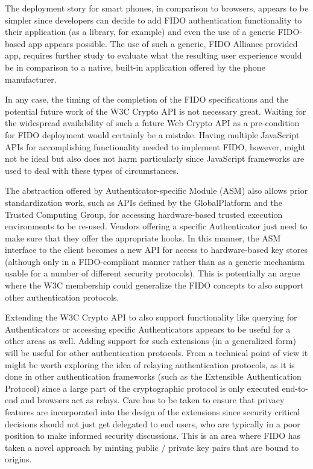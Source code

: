 \documentclass[peerreview, a4paper, 7pt]{IEEEtran}
\begin{document}
The deployment story for smart phones, in comparison to browsers, appears to be simpler since developers can decide to add FIDO authentication functionality to their application (as a library, for example) and even the use of a generic FIDO-based app appears possible. The use of such a generic, FIDO Alliance provided app, requires further study to evaluate what the resulting user experience would be in comparison to a native, built-in application offered by the phone manufacturer. 

In any case, the timing of the completion of the FIDO specifications and the potential future work of the W3C Crypto API is not necessary great. Waiting for the widespread availability of such a future Web Crypto API as a pre-condition for FIDO deployment would certainly be a mistake. Having multiple JavaScript APIs for accomplishing functionality needed to implement FIDO, however, might not be ideal but also does not harm particularly since JavaScript frameworks are used to deal with these types of circumstances.  

The abstraction offered by Authenticator-specific Module (ASM) also allows prior standardization work, such as APIs defined by the GlobalPlatform and the Trusted Computing Group, for accessing hardware-based trusted execution environments to be re-used. Vendors offering a specific Authenticator just need to make sure that they offer the appropriate hooks. In this manner, the ASM interface to the client becomes a new API for access to hardware-based key stores (although only in a FIDO-compliant manner rather than as a generic mechanism usable for a number of different security protocols). This is potentially an argue where the W3C membership could generalize the FIDO concepts to also support other authentication protocols. 

Extending the W3C Crypto API to also support functionality like querying for Authenticators or accessing specific Authenticators appears to be useful for a other areas as well. Adding support for such extensions (in a generalized form) will be useful for other authentication protocols. From a technical point of view it might be worth exploring the idea of relaying authentication protocols, as it is done in other authentication frameworks (such as the Extensible Authentication Protocol) since a large part of the cryptographic protocol is only executed end-to-end and browsers act as relays. Care has to be taken to ensure that privacy features are incorporated into the design of the extensions since security critical decisions should not just get delegated to end users, who are typically in a poor position to make informed security discussions. This is an area where FIDO has taken a novel approach by minting public / private key pairs that are bound to origins.  
\end{document}
